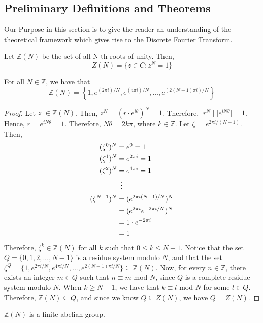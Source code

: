 \documentclass[../article.tex]{subfiles}
\begin{document}
\subsection{Preliminary Definitions and Theorems}
	Our Purpose in this section is to give the reader an understanding of the theoretical framework which gives rise to the Discrete Fourier Transform.

\begin{definition}
Let $\mathbb{Z}(N)$ be the set of all N-th roots of unity. Then,
 \[Z(N) = \{z \in C : z^N = 1 \}\]
\end{definition}
\begin{theorem}
For all $N \in \mathbb{Z}$, we have that
\[\mathbb{Z}(N)= \left\{1, e^{(2 \pi i)/N}, e^{(4 \pi i)/N}, \ldots, e^{(2(N-1) \pi i)/N}\right\}\]
\end{theorem}

\begin{proof}
Let $z$ $\in \mathbb{Z}(N)$. Then, $z^N = (r \cdot e^{i \theta})^N = 1$. Therefore, $\mid r^N \mid \mid e^{i N \theta} \mid = 1$. Hence, $r = e^{i N \theta} = 1$. Therefore, $N\theta = 2k\pi$, where $k \in \mathbb{Z}$. Let $\zeta$ = $e^{2 \pi i /(N-1)}$. Then,
\begin{align*}
	(\zeta^0)^N &= e^0 = 1 \\
	(\zeta^1)^N &= e^{2 \pi i} = 1 \\
	(\zeta^2)^N &= e^{4 \pi i} = 1 \\
	{} &\vdotswithin{=}\\
	(\zeta^{N-1})^N &= (e^{2 \pi i(N-1)/N})^N \\
	{} &= (e^{2 \pi i}e^{-2 \pi i/N})^N \\
	{} &= 1 \cdot e^{-2 \pi i} \\
	{} &= 1
\end{align*}
Therefore, $\zeta^k \in \mathbb{Z}(N)$ for all $k$ such that $0 \leq k \leq N-1$. Notice that the set $Q = \{0, 1, 2, ..., N-1\}$ is a residue system modulo $N$, and that the set $\zeta^Q = \{1, e^{2 \pi i/N}, e^{4 \pi i/N}, ..., e^{2(N-1) \pi i/N}\} \subseteq \mathbb{Z}(N)$. Now, for every $n \in \mathbb{Z}$, there exists an integer $m \in Q$ such that $n \equiv m$ mod $N$, since $Q$ is a complete residue system modulo $N$. When $k \geq N-1$, we have that $k \equiv l$ mod $N$ for some $l \in Q$. Therefore, $\mathbb{Z}(N) \subseteq Q$, and since we know $Q \subseteq Z(N)$, we have $Q = Z(N)$.
\end{proof}

\begin{theorem}
$\mathbb{Z}(N)$ is a finite abelian group.
\end{theorem}
\end{document}
